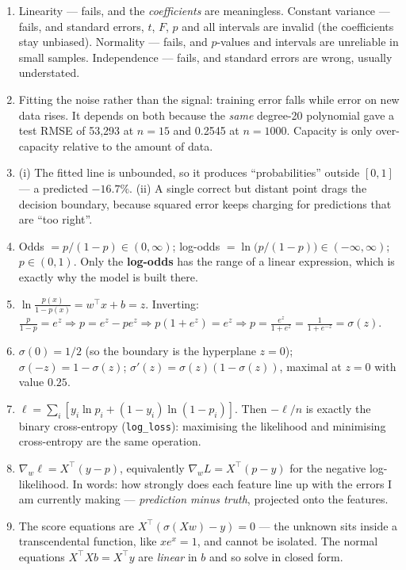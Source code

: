 \documentclass[11pt,a4paper]{article}
\newcommand{\A}[1]{\item[\textbf{#1}]}
\begin{document}
\begin{enumerate}[leftmargin=1.9cm]
\A{U5.28} Linearity --- fails, and the \emph{coefficients} are meaningless.
Constant variance --- fails, and standard errors, $t$, $F$, $p$ and all
intervals are invalid (the coefficients stay unbiased). Normality --- fails,
and $p$-values and intervals are unreliable in small samples. Independence ---
fails, and standard errors are wrong, usually understated.

\A{U5.29} Fitting the noise rather than the signal: training error falls while
error on new data rises. It depends on both because the \emph{same} degree-20
polynomial gave a test RMSE of 53{,}293 at $n = 15$ and 0.2545 at $n = 1000$.
Capacity is only over-capacity relative to the amount of data.

\A{U5.30} (i) The fitted line is unbounded, so it produces ``probabilities''
outside $[0,1]$ --- a predicted $-16.7\%$. (ii) A single correct but distant
point drags the decision boundary, because squared error keeps charging for
predictions that are ``too right''.

\A{U5.31} Odds $= p/(1-p) \in (0,\infty)$; log-odds
$= \ln\!\big(p/(1-p)\big) \in (-\infty,\infty)$; $p \in (0,1)$. Only the
\textbf{log-odds} has the range of a linear expression, which is exactly why
the model is built there.

\A{U5.32} $\ln\!\frac{p(x)}{1-p(x)} = w^\top x + b = z$. Inverting:
$\frac{p}{1-p} = e^z \Rightarrow p = e^z - pe^z \Rightarrow p(1+e^z) = e^z
\Rightarrow p = \frac{e^z}{1+e^z} = \frac{1}{1+e^{-z}} = \sigma(z)$.

\A{U5.33} $\sigma(0) = 1/2$ (so the boundary is the hyperplane $z = 0$);
$\sigma(-z) = 1-\sigma(z)$; $\sigma'(z) = \sigma(z)(1-\sigma(z))$, maximal at
$z = 0$ with value $0.25$.

\A{U5.34} $\ell = \sum_i[y_i\ln p_i + (1-y_i)\ln(1-p_i)]$. Then $-\ell/n$ is
exactly the binary cross-entropy (\texttt{log\_loss}): maximising the
likelihood and minimising cross-entropy are the same operation.

\A{U5.35} $\nabla_w\ell = X^\top(y - p)$, equivalently
$\nabla_w L = X^\top(p - y)$ for the negative log-likelihood. In words: how
strongly does each feature line up with the errors I am currently making ---
\emph{prediction minus truth}, projected onto the features.

\A{U5.36} The score equations are $X^\top(\sigma(Xw) - y) = 0$ --- the unknown
sits inside a transcendental function, like $xe^x = 1$, and cannot be isolated.
The normal equations $X^\top Xb = X^\top y$ are \emph{linear} in $b$ and so
solve in closed form.


\end{enumerate}
\end{document}
